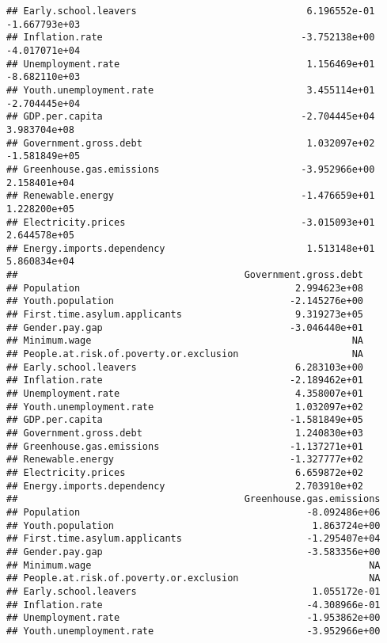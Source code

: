 \documentclass[
]{article}
\begin{document}
\begin{verbatim}
## Early.school.leavers                              6.196552e-01  -1.667793e+03
## Inflation.rate                                   -3.752138e+00  -4.017071e+04
## Unemployment.rate                                 1.156469e+01  -8.682110e+03
## Youth.unemployment.rate                           3.455114e+01  -2.704445e+04
## GDP.per.capita                                   -2.704445e+04   3.983704e+08
## Government.gross.debt                             1.032097e+02  -1.581849e+05
## Greenhouse.gas.emissions                         -3.952966e+00   2.158401e+04
## Renewable.energy                                 -1.476659e+01   1.228200e+05
## Electricity.prices                               -3.015093e+01   2.644578e+05
## Energy.imports.dependency                         1.513148e+01   5.860834e+04
##                                        Government.gross.debt
## Population                                      2.994623e+08
## Youth.population                               -2.145276e+00
## First.time.asylum.applicants                    9.319273e+05
## Gender.pay.gap                                 -3.046440e+01
## Minimum.wage                                              NA
## People.at.risk.of.poverty.or.exclusion                    NA
## Early.school.leavers                            6.283103e+00
## Inflation.rate                                 -2.189462e+01
## Unemployment.rate                               4.358007e+01
## Youth.unemployment.rate                         1.032097e+02
## GDP.per.capita                                 -1.581849e+05
## Government.gross.debt                           1.240830e+03
## Greenhouse.gas.emissions                       -1.137271e+01
## Renewable.energy                               -1.327777e+02
## Electricity.prices                              6.659872e+02
## Energy.imports.dependency                       2.703910e+02
##                                        Greenhouse.gas.emissions
## Population                                        -8.092486e+06
## Youth.population                                   1.863724e+00
## First.time.asylum.applicants                      -1.295407e+04
## Gender.pay.gap                                    -3.583356e+00
## Minimum.wage                                                 NA
## People.at.risk.of.poverty.or.exclusion                       NA
## Early.school.leavers                               1.055172e-01
## Inflation.rate                                    -4.308966e-01
## Unemployment.rate                                 -1.953862e+00
## Youth.unemployment.rate                           -3.952966e+00

\end{verbatim}
\end{document}
